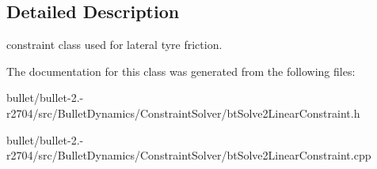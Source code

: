 \begin{DoxyCompactItemize}
\end{DoxyCompactItemize}


\subsection{Detailed Description}
constraint class used for lateral tyre friction. 

The documentation for this class was generated from the following files\+:\begin{DoxyCompactItemize}
\item 
bullet/bullet-\/2.-\/r2704/src/\+Bullet\+Dynamics/\+Constraint\+Solver/bt\+Solve2\+Linear\+Constraint.\+h\item 
bullet/bullet-\/2.-\/r2704/src/\+Bullet\+Dynamics/\+Constraint\+Solver/bt\+Solve2\+Linear\+Constraint.\+cpp\end{DoxyCompactItemize}
